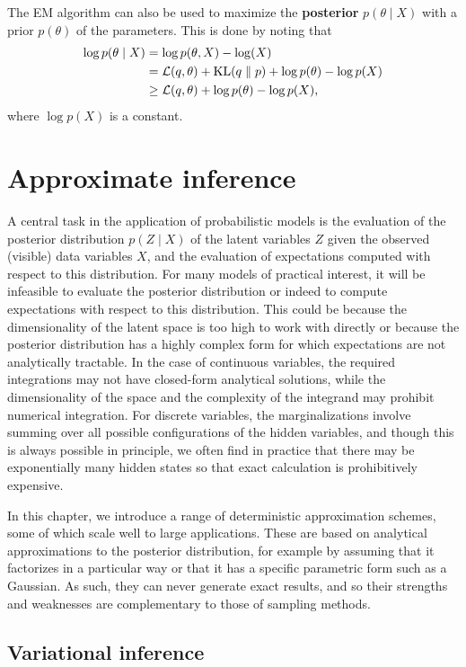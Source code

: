 \documentclass[a4paper]{article}
\begin{document}
The EM algorithm can also be used to maximize the
\textbf{posterior}
$p(\theta \mid X)$ with a prior $p(\theta)$
of the parameters. This is done by noting that
\[
\begin{aligned}
\log p(\theta \mid X)
&= \log p(\theta, X) - \log (X) \\
&= \mathcal{L}(q, \theta) + \mathrm{KL}(q \; \Vert \; p) + \log p(\theta) - \log p(X) \\
&\geq \mathcal{L}(q, \theta) + \log p(\theta) - \log p(X),
\end{aligned}
\]
where $\log p(X)$ is a constant.


\section{Approximate inference}
A central task in the application of probabilistic models is
the evaluation of the posterior distribution $p(Z \mid X)$ of the
latent variables $Z$ given the observed (visible) data variables
$X$, and the evaluation of expectations computed with respect
to this distribution. For many models of practical interest,
it will be infeasible
to evaluate the posterior distribution or indeed to compute
expectations with respect to this distribution.
This could be because the dimensionality of
the latent space is too high to work with directly or
because the posterior distribution has a highly complex
form for which expectations are not analytically tractable.
In the case of continuous variables, the required
integrations may not have closed-form analytical solutions,
while the dimensionality of the space and the complexity of
the integrand may prohibit numerical integration.
For discrete variables, the marginalizations involve
summing over all possible configurations of the hidden
variables, and though this is always possible in principle,
we often find in practice that there may be exponentially
many hidden states so that exact calculation is
prohibitively expensive.

In this chapter, we introduce a range of deterministic
approximation schemes, some of which scale well to large
applications. These are based on analytical approximations
to the posterior distribution, for example by assuming that
it factorizes in a particular way or that it has a specific
parametric form such as a Gaussian. As such, they can never
generate exact results, and so their strengths and weaknesses
are complementary to those of sampling methods.

\subsection{Variational inference}
\end{document}

